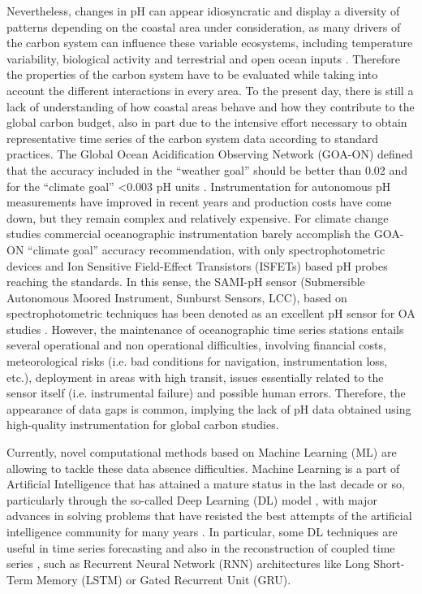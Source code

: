Nevertheless, changes in pH can appear idiosyncratic and display a
diversity of patterns depending on the coastal area under consideration, as
many drivers of the carbon system can influence these variable ecosystems,
including temperature variability, biological activity and terrestrial and open
ocean inputs \cite{Carstensen2019}. Therefore the properties of the carbon
system have to be evaluated while taking into account the different
interactions in every area. To the present day, there is still a lack of
understanding of how coastal areas behave and how they contribute to the global
carbon budget, also in part due to the intensive effort necessary to obtain
representative time series of the carbon system data according to standard
practices. The Global Ocean Acidification Observing Network (GOA-ON) defined
that the accuracy included in the “weather goal” should be better than 0.02 and
for the “climate goal” <0.003 pH units \cite{newton2015}. Instrumentation for
autonomous pH measurements have improved in recent years and production costs
have come down, but they remain complex and relatively expensive. For climate
change studies commercial oceanographic instrumentation barely accomplish the
GOA-ON “climate goal” accuracy recommendation, with only spectrophotometric
devices and Ion Sensitive Field-Effect Transistors (ISFETs) based pH probes
reaching the standards. In this sense, the SAMI-pH sensor (Submersible
Autonomous Moored Instrument, Sunburst Sensors, LCC), based on
spectrophotometric techniques has been denoted as an excellent pH sensor for OA
studies \cite{Flecha2015}. However, the maintenance of oceanographic time
series stations entails several operational and non operational difficulties,
involving financial costs, meteorological risks (i.e. bad conditions for
navigation, instrumentation loss, etc.), deployment in areas with high transit,
issues essentially related to the sensor itself (i.e. instrumental failure) and
possible human errors. Therefore, the appearance of data gaps is common,
implying the lack of pH data obtained using high-quality instrumentation for
global carbon studies.

Currently, novel computational methods based on Machine Learning (ML) are
allowing to tackle these data absence difficulties. Machine Learning is a part
of Artificial Intelligence that has attained a mature status in the last decade
or so, particularly through the so-called Deep Learning (DL) model
\cite{Goodfellow2016}, with major advances in solving problems that have
resisted the best attempts of the artificial intelligence community for many
years \cite{LeCun2015}. In particular, some DL techniques are useful in time
series forecasting \cite{Hewamalage2021} and also in the reconstruction of
coupled time series \cite{Huang2020}, such as Recurrent Neural Network (RNN)
architectures like Long Short-Term Memory (LSTM) \cite{LSTM_NN} or Gated
Recurrent Unit (GRU).

